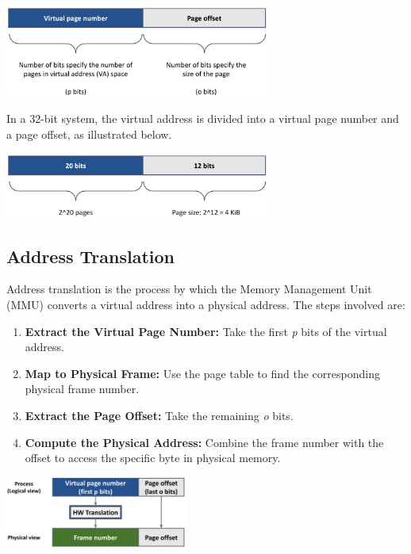 \begin{minipage}{\linewidth}
  \centering
  \includegraphics[width=0.65\textwidth]{chapters/L5/images/virtual.png}
\end{minipage}
\newpage
\begin{example}
In a 32-bit system, the virtual address is divided into a virtual page number and a page offset, as illustrated below.\\
\begin{center}
  \includegraphics[width=0.65\textwidth]{chapters/L5/images/paging-example.png}
\end{center}
\end{example}

\subsection{Address Translation}
Address translation is the process by which the Memory Management Unit (MMU) converts a virtual address into a physical address. The steps involved are:
\begin{enumerate}
  \item \textbf{Extract the Virtual Page Number:} Take the first \textit{p} bits of the virtual address.
  \item \textbf{Map to Physical Frame:} Use the page table to find the corresponding physical frame number.
  \item \textbf{Extract the Page Offset:} Take the remaining \textit{o} bits.
  \item \textbf{Compute the Physical Address:} Combine the frame number with the offset to access the specific byte in physical memory.
\end{enumerate}

\begin{center}
  \includegraphics[width=0.45\textwidth]{chapters/L5/images/translation.png}
\end{center}

